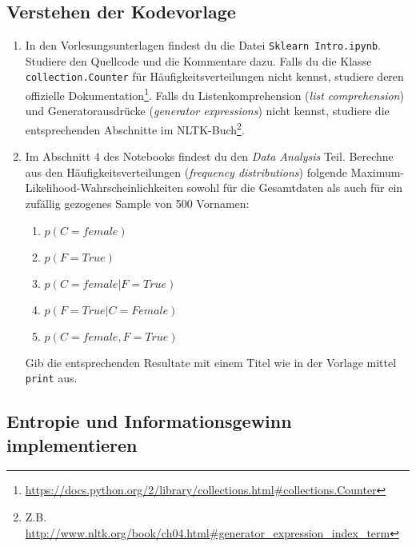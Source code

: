 \documentclass[a4paper,10pt]{article}
\newcommand{\punkte}[1]{(\emph{#1 p})}
\begin{document}
\subsection{Verstehen der Kodevorlage}

\begin{enumerate}
\item In den Vorlesungsunterlagen findest du die Datei \texttt{Sklearn Intro.ipynb}. Studiere den Quellcode und die Kommentare dazu. Falls du die Klasse \lstinline!collection.Counter! für Häufigkeitsverteilungen nicht kennst, studiere deren offizielle Dokumentation\footnote{\url{https://docs.python.org/2/library/collections.html\#collections.Counter}}. Falls du Listenkomprehension (\textit{list comprehension}) und Generatorausdrücke (\textit{generator expressions}) nicht kennst, studiere die entsprechenden Abschnitte im NLTK-Buch\footnote{Z.B. \url{http://www.nltk.org/book/ch04.html\#generator_expression_index_term}}.

\item Im Abschnitt 4 des Notebooks findest du den \emph{Data Analysis} Teil. Berechne aus den Häufigkeitsverteilungen (\textit{frequency distributions}) folgende Maximum-Likelihood-Wahrscheinlichkeiten sowohl für die Gesamtdaten als auch für ein zufällig gezogenes Sample von 500 Vornamen:
\begin{enumerate}
\item $p(C=female)$
\item $p(F=True)$
\item $p(C=female|F=True)$
\item $p(F=True|C=Female)$
\item $p(C=female,F=True)$
\end{enumerate}
Gib die entsprechenden Resultate mit einem Titel wie in der Vorlage mittel \lstinline!print! aus.
\end{enumerate}

\subsection{Entropie und Informationsgewinn implementieren}
\end{document}
